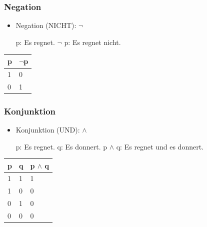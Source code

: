 
\begin{frame}
\frametitle{Negation}

\begin{itemize}
	\item Negation (NICHT): $\lnot$
	
	\eal
		\ex p: Es regnet.
		\ex $\lnot$ p: Es regnet nicht.
	\zl
	
\end{itemize}

\begin{table}
\centering
\begin{tabular}{p{3cm}|p{3cm}}
\textbf{p} & \textbf{$\lnot$p}\\
\hline
1 & 0\\
\hline
0 & 1\\
\end{tabular}
\end{table}

\end{frame}



\begin{frame}
\frametitle{Konjunktion}

\begin{itemize}
	\item Konjunktion (UND): $\land$
	
	\eal
		\ex p: Es regnet.
		\ex q: Es donnert.
		\ex p $\land$ q: Es regnet und es donnert.
	\zl

\end{itemize}
	

\begin{table}
\centering

\begin{tabular}{p{2cm}|p{2cm}|p{2cm}}
\textbf{p} & \textbf{q} & \textbf{p} $\land$ \textbf{q}\\
\hline
1 & 1 & 1\\
\hline
1 & 0 & 0\\
\hline
0 & 1 & 0\\
\hline 
0 & 0 & 0\\
\end{tabular}

\end{table}	

\end{frame}



